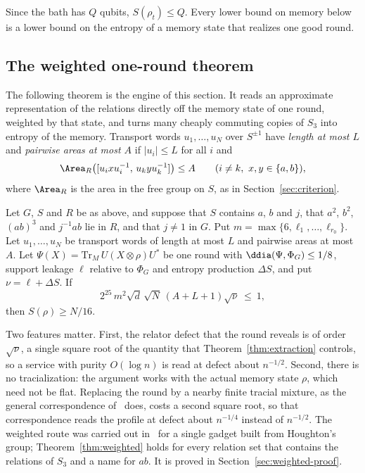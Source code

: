 Since the bath has $Q$ qubits, $S(\rho_t)\le Q$. Every lower bound on memory below is a lower bound on the entropy of a memory state that realizes
one good round.

\subsection{The weighted one-round theorem}\label{sec:weighted-statement}

The following theorem is the engine of this section. It reads an approximate representation of the relations directly off the memory state of
one round, weighted by that state, and turns many cheaply commuting copies of $S_3$ into entropy of the memory. Transport words $u_1,\dots,u_N$
over $S^{\pm1}$ have \emph{length at most $L$} and \emph{pairwise areas at most $A$} if $|u_i|\le L$ for all $i$ and
\[
\Area_R\bigl([u_ixu_i^{-1},\,u_kyu_k^{-1}]\bigr)\le A\qquad(i\ne k,\ x,y\in\{a,b\}),
\]
where $\Area_R$ is the area in the free group on $S$, as in Section~\ref{sec:criterion}.

\begin{theorem}\label{thm:weighted}
Let $G$, $S$ and $R$ be as above, and suppose that $S$ contains $a$, $b$ and $j$, that $a^2$, $b^2$, $(ab)^3$ and $j^{-1}ab$ lie in $R$, and that
$j\ne1$ in $G$. Put $m=\max\{6,\ell_1,\dots,\ell_{r_0}\}$. Let $u_1,\dots,u_N$ be transport words of length at most $L$ and pairwise areas at most
$A$. Let $\Psi(X)=\mathrm{Tr}_M\,U(X\otimes\rho)U^*$ be one round with $\ddia(\Psi,\Phi_G)\le1/8$, support leakage $\ell$ relative to $\Phi_G$ and
entropy production $\Delta S$, and put $\nu=\ell+\Delta S$. If
\begin{equation}\label{eq:weighted-condition}
2^{25}\,m^2\sqrt d\,\sqrt N\,(A+L+1)\sqrt\nu\ \le\ 1,
\end{equation}
then $S(\rho)\ge N/16$.
\end{theorem}

Two features matter. First, the relator defect that the round reveals is of order $\sqrt\nu$, a single square root of the quantity that
Theorem~\ref{thm:extraction} controls, so a service with purity $O(\log n)$ is read at defect about $n^{-1/2}$. Second, there is no
tracialization: the argument works with the actual memory state $\rho$, which need not be flat. Replacing the round by a nearby finite tracial
mixture, as the general correspondence of~\cite{DouglasMghirbiB} does, costs a second square root, so that correspondence reads the profile at
defect about $n^{-1/4}$ instead of $n^{-1/2}$. The weighted route was
carried out in~\cite{DouglasMghirbiB} for a single gadget built from Houghton's group; Theorem~\ref{thm:weighted} holds for every relation
set that contains the relations of $S_3$ and a name for $ab$. It is proved in Section~\ref{sec:weighted-proof}.

